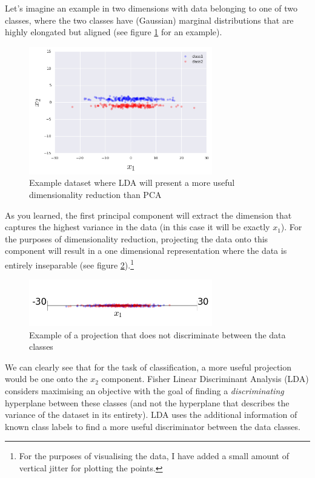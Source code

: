 \documentclass{article}
\begin{document}
Let's imagine an example in two dimensions with data belonging to one of two classes, where the two classes have (Gaussian) marginal distributions that are highly elongated but aligned (see figure \ref{fig:lda_vs_pcs_ex} for an example).
\begin{figure}[h]
\center
\includegraphics[width=8cm]{lda_vs_pcs_ex}
\caption{Example dataset where LDA will present a more useful dimensionality reduction than PCA}\label{fig:lda_vs_pcs_ex}
\end{figure}
As you learned, the first principal component will extract the dimension that captures the highest variance in the data (in this case it will be exactly $x_1$). For the purposes of dimensionality reduction, projecting the data onto this component will result in a one dimensional representation where the data is entirely inseparable (see figure \ref{fig:pca_projection}).\footnote{For the purposes of visualising the data, I have added a small amount of vertical jitter for plotting the points.}

\begin{figure}[h]
\center
\includegraphics[width=8cm]{pca_projection}
\caption{Example of a projection that does not discriminate between the data classes}\label{fig:pca_projection}
\end{figure}

We can clearly see that for the task of classification, a more useful projection would be one onto the $x_2$ component. Fisher Linear Discriminant Analysis (LDA) considers maximising an objective with the goal of finding a \textit{discriminating} hyperplane between these classes \cite{welling2005fisher} (and not the hyperplane that describes the variance of the dataset in its entirety). LDA uses the additional information of known class labels to find a more useful discriminator between the data classes.
\end{document}
